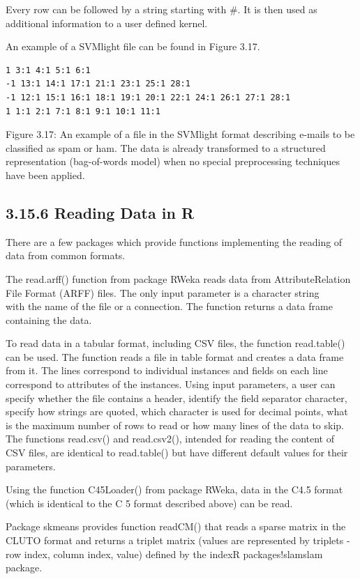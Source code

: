 \documentclass[10pt]{book}
\begin{document}
Every row can be followed by a string starting with \#. It is then used as additional information to a user defined kernel.

An example of a SVMlight file can be found in Figure 3.17.

\begin{verbatim}
1 3:1 4:1 5:1 6:1
-1 13:1 14:1 17:1 21:1 23:1 25:1 28:1
-1 12:1 15:1 16:1 18:1 19:1 20:1 22:1 24:1 26:1 27:1 28:1
1 1:1 2:1 7:1 8:1 9:1 10:1 11:1
\end{verbatim}

Figure 3.17: An example of a file in the SVMlight format describing e-mails to be classified as spam or ham. The data is already transformed to a structured representation (bag-of-words model) when no special preprocessing techniques have been applied.

\subsection*{3.15.6 Reading Data in R}
There are a few packages which provide functions implementing the reading of data from common formats.

The read.arff() function from package RWeka reads data from AttributeRelation File Format (ARFF) files. The only input parameter is a character string\\
with the name of the file or a connection. The function returns a data frame containing the data.

To read data in a tabular format, including CSV files, the function read.table() can be used. The function reads a file in table format and creates a data frame from it. The lines correspond to individual instances and fields on each line correspond to attributes of the instances. Using input parameters, a user can specify whether the file contains a header, identify the field separator character, specify how strings are quoted, which character is used for decimal points, what is the maximum number of rows to read or how many lines of the data to skip. The functions read.csv() and read.csv2(), intended for reading the content of CSV files, are identical to read.table() but have different default values for their parameters.

Using the function C45Loader() from package RWeka, data in the C4.5 format (which is identical to the C 5 format described above) can be read.

Package skmeans provides function readCM() that reads a sparse matrix in the CLUTO format and returns a triplet matrix (values are represented by triplets - row index, column index, value) defined by the indexR packages!slamslam package.
\end{document}
